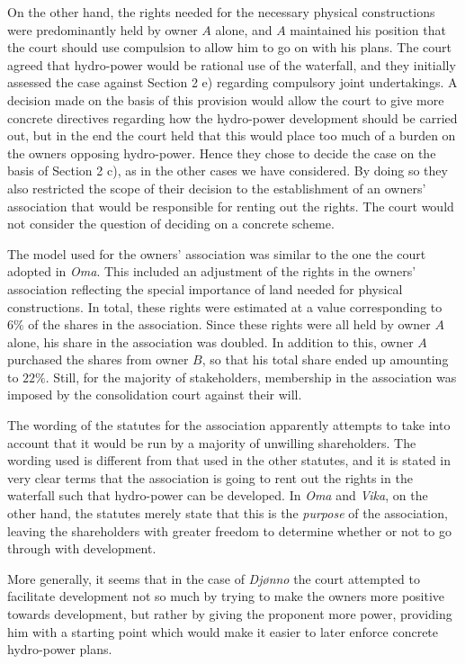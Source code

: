 \documentclass[10pt]{article} %
\begin{document}
On the other hand, the rights needed for the necessary physical constructions were predominantly held by owner $A$ alone, and $A$ maintained his position that the court should use compulsion to allow him to go on with his plans. The court agreed that hydro-power would be rational use of the waterfall, and they initially assessed the case against Section 2 e) regarding compulsory joint undertakings. A decision made on the basis of this provision would allow the court to give more concrete directives regarding how the hydro-power development should be carried out, but in the end the court held that this would place too much of a burden on the owners opposing hydro-power. Hence they chose to decide the case on the basis of Section 2 c), as in the other cases we have considered. By doing so they also restricted the scope of their decision to the establishment of an owners' association that would be responsible for renting out the rights. The court would not consider the question of deciding on a concrete scheme.

The model used for the owners' association was similar to the one the court adopted in \emph{Oma}. This included an adjustment of the rights in the owners' association reflecting the special importance of land needed for physical constructions. In total, these rights were estimated at a value corresponding to $6 \%$ of the shares in the association. Since these rights were all held by owner $A$ alone, his share in the association was doubled. In addition to this, owner $A$ purchased the shares from owner $B$, so that his total share ended up amounting to $22 \%$. Still, for the majority of stakeholders, membership in the association was imposed by the consolidation court against their will.

The wording of the statutes for the association apparently attempts to take into account that it would be run by a majority of unwilling shareholders. The wording used is different from that used in the other statutes, and it is stated in very clear terms that the association is going to rent out the rights in the waterfall such that hydro-power can be developed. In \emph{Oma} and \emph{Vika}, on the other hand, the statutes merely state that this is the \emph{purpose} of the association, leaving the shareholders with greater freedom to determine whether or not to go through with development.

More generally, it seems that in the case of \emph{Djønno} the court attempted to facilitate development not so much by trying to make the owners more positive towards development, but rather by giving the proponent more power, providing him with a starting point which would make it easier to later enforce concrete hydro-power plans.
\end{document}
